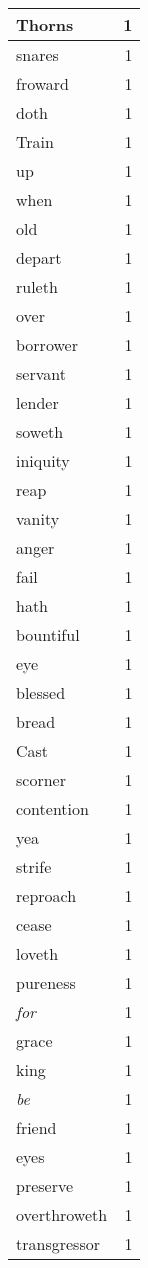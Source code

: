 \begin{center}
\begin{longtable}{l|r}
Thorns & 1\\ \hline 
snares & 1\\ \hline 
froward & 1\\ \hline 
doth & 1\\ \hline 
Train & 1\\ \hline 
up & 1\\ \hline 
when & 1\\ \hline 
old & 1\\ \hline 
depart & 1\\ \hline 
ruleth & 1\\ \hline 
over & 1\\ \hline 
borrower & 1\\ \hline 
servant & 1\\ \hline 
lender & 1\\ \hline 
soweth & 1\\ \hline 
iniquity & 1\\ \hline 
reap & 1\\ \hline 
vanity & 1\\ \hline 
anger & 1\\ \hline 
fail & 1\\ \hline 
hath & 1\\ \hline 
bountiful & 1\\ \hline 
eye & 1\\ \hline 
blessed & 1\\ \hline 
bread & 1\\ \hline 
Cast & 1\\ \hline 
scorner & 1\\ \hline 
contention & 1\\ \hline 
yea & 1\\ \hline 
strife & 1\\ \hline 
reproach & 1\\ \hline 
cease & 1\\ \hline 
loveth & 1\\ \hline 
pureness & 1\\ \hline 
\emph{for} & 1\\ \hline 
grace & 1\\ \hline 
king & 1\\ \hline 
\emph{be} & 1\\ \hline 
friend & 1\\ \hline 
eyes & 1\\ \hline 
preserve & 1\\ \hline 
overthroweth & 1\\ \hline 
transgressor & 1\\ \hline 

\end{longtable}
\end{center}
